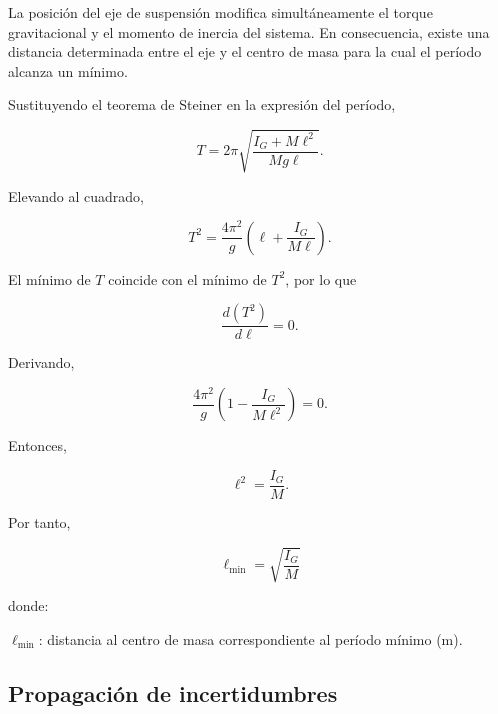 \documentclass[11pt,a4paper]{article}
\newenvironment{subsectionbody}
{%
    \begin{list}{}{%
        \setlength{\leftmargin}{0.6cm}%
        \setlength{\rightmargin}{0cm}%
        \setlength{\topsep}{0pt}%
        \setlength{\partopsep}{0pt}%
        \setlength{\parsep}{0pt}%
        \setlength{\itemsep}{0pt}%
    }%
    \item\relax
}
{%
    \end{list}
}
\begin{document}
\begin{subsectionbody}

La posición del eje de suspensión modifica simultáneamente el torque
gravitacional y el momento de inercia del sistema. En consecuencia,
existe una distancia determinada entre el eje y el centro de masa para
la cual el período alcanza un mínimo.

Sustituyendo el teorema de Steiner en la expresión del período,

\[
T=
2\pi
\sqrt{
\frac{I_G+M\ell^2}{Mg\ell}
}.
\]

Elevando al cuadrado,

\[
T^2=
\frac{4\pi^2}{g}
\left(
\ell+\frac{I_G}{M\ell}
\right).
\]

El mínimo de $T$ coincide con el mínimo de $T^2$, por lo que

\[
\frac{d(T^2)}{d\ell}=0.
\]

Derivando,

\[
\frac{4\pi^2}{g}
\left(
1-\frac{I_G}{M\ell^2}
\right)=0.
\]

Entonces,

\[
\ell^2=\frac{I_G}{M}.
\]

Por tanto,

\begin{equation}
\boxed{
\ell_{\min}=
\sqrt{\frac{I_G}{M}}
}
\label{eq:distancia_periodo_minimo}
\end{equation}

donde:

\hspace*{0.5cm}$\ell_{\min}$: distancia al centro de masa correspondiente
al período mínimo ($\mathrm{m}$).

\end{subsectionbody}

\subsection{Propagación de incertidumbres}
\end{document}
